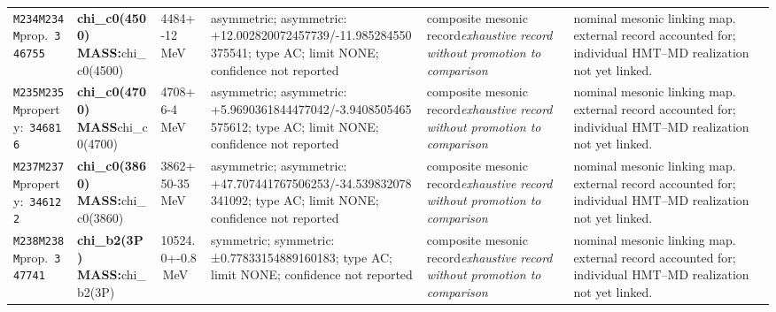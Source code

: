 \begin{landscape}
\begin{longtable}{L{1.85cm}L{4.45cm}L{2.35cm}L{4.05cm}L{3.35cm}L{7.15cm}}
\texttt{M234}\newline \texttt{M234M}\newline prop.\ \texttt{346755} & \textbf{chi\_\allowbreak{}c0(4500) MASS:}\newline chi\_\allowbreak{}c0(4500) & 4484+-12\,MeV & asymmetric; asymmetric: +12.002820072457739/-11.985284550375541; type AC; limit NONE; confidence not reported & composite mesonic record\newline \emph{exhaustive record without promotion to comparison} & nominal mesonic linking map. external record accounted for; individual HMT--MD realization not yet linked. \\
\texttt{M235}\newline \texttt{M235M}\newline property:\ \texttt{346816} & \textbf{chi\_\allowbreak{}c0(4700) MASS}\newline chi\_\allowbreak{}c0(4700) & 4708+6-4\,MeV & asymmetric; asymmetric: +5.9690361844477042/-3.9408505465575612; type AC; limit NONE; confidence not reported & composite mesonic record\newline \emph{exhaustive record without promotion to comparison} & nominal mesonic linking map. external record accounted for; individual HMT--MD realization not yet linked. \\
\texttt{M237}\newline \texttt{M237M}\newline property:\ \texttt{346122} & \textbf{chi\_\allowbreak{}c0(3860) MASS:}\newline chi\_\allowbreak{}c0(3860) & 3862+50-35\,MeV & asymmetric; asymmetric: +47.707441767506253/-34.539832078341092; type AC; limit NONE; confidence not reported & composite mesonic record\newline \emph{exhaustive record without promotion to comparison} & nominal mesonic linking map. external record accounted for; individual HMT--MD realization not yet linked. \\
\texttt{M238}\newline \texttt{M238M}\newline prop.\ \texttt{347741} & \textbf{chi\_\allowbreak{}b2(3P) MASS:}\newline chi\_\allowbreak{}b2(3P) & 10524.0+-0.8\,MeV & symmetric; symmetric: ±0.77833154889160183; type AC; limit NONE; confidence not reported & composite mesonic record\newline \emph{exhaustive record without promotion to comparison} & nominal mesonic linking map. external record accounted for; individual HMT--MD realization not yet linked. \\

\end{longtable}
\end{landscape}
